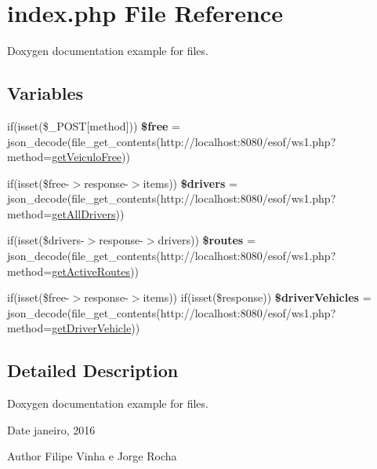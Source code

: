 \hypertarget{index_8php}{}\section{index.\+php File Reference}
\label{index_8php}


Doxygen documentation example for files.  


\subsection*{Variables}
\begin{DoxyCompactItemize}
\item 
if(isset(\$\+\_\+\+P\+O\+ST\mbox{[}\textquotesingle{}method\textquotesingle{}\mbox{]})) {\bfseries \$free} = json\+\_\+decode(file\+\_\+get\+\_\+contents(\textquotesingle{}http\+://localhost\+:8080/esof/ws1.\+php?method=\hyperlink{ws1_8php_ad20ee002e4ad5a68c635b2fdc8ffd354}{get\+Veiculo\+Free}\textquotesingle{}))\hypertarget{index_8php_aef7d3f00e38b8b34598546fb3d26d4b5}{}\label{index_8php_aef7d3f00e38b8b34598546fb3d26d4b5}

\item 
if(isset(\$free-\/$>$response-\/$>$items)) {\bfseries \$drivers} = json\+\_\+decode(file\+\_\+get\+\_\+contents(\textquotesingle{}http\+://localhost\+:8080/esof/ws1.\+php?method=\hyperlink{ws1_8php_aec49061f5b7df1eec5e60f461b479703}{get\+All\+Drivers}\textquotesingle{}))\hypertarget{index_8php_ad6452a868637215e3078b630495be5b2}{}\label{index_8php_ad6452a868637215e3078b630495be5b2}

\item 
if(isset(\$drivers-\/$>$response-\/$>$drivers)) {\bfseries \$routes} = json\+\_\+decode(file\+\_\+get\+\_\+contents(\textquotesingle{}http\+://localhost\+:8080/esof/ws1.\+php?method=\hyperlink{ws1_8php_ac96bd820eb32f1b05112750160c66475}{get\+Active\+Routes}\textquotesingle{}))\hypertarget{index_8php_a41dd7854f6cf6fcf0da5977d26e34d41}{}\label{index_8php_a41dd7854f6cf6fcf0da5977d26e34d41}

\item 
if(isset(\$free-\/$>$response-\/$>$items)) if(isset(\$response)) {\bfseries \$driver\+Vehicles} = json\+\_\+decode(file\+\_\+get\+\_\+contents(\textquotesingle{}http\+://localhost\+:8080/esof/ws1.\+php?method=\hyperlink{ws1_8php_a18b7b33f22562330013f8b5c503b222f}{get\+Driver\+Vehicle}\textquotesingle{}))\hypertarget{index_8php_a668237b864347e4781dabc69d3b00605}{}\label{index_8php_a668237b864347e4781dabc69d3b00605}

\end{DoxyCompactItemize}


\subsection{Detailed Description}
Doxygen documentation example for files. 

\begin{DoxyDate}{Date}
janeiro, 2016 
\end{DoxyDate}
\begin{DoxyAuthor}{Author}
Filipe Vinha e Jorge Rocha 
\end{DoxyAuthor}
